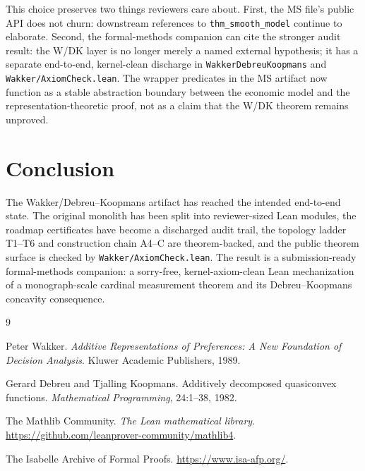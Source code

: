 \documentclass[11pt,english]{article}
\begin{document}
This choice preserves two things reviewers care about.  First, the MS file's public API does not churn: downstream references to \texttt{thm\_smooth\_model} continue to elaborate.  Second, the formal-methods companion can cite the stronger audit result: the W/DK layer is no longer merely a named external hypothesis; it has a separate end-to-end, kernel-clean discharge in \texttt{WakkerDebreuKoopmans} and \texttt{Wakker/AxiomCheck.lean}.  The wrapper predicates in the MS artifact now function as a stable abstraction boundary between the economic model and the representation-theoretic proof, not as a claim that the W/DK theorem remains unproved.

\section{Conclusion}
\label{sec:conclusion}

The Wakker/Debreu--Koopmans artifact has reached the intended end-to-end state.  The original monolith has been split into reviewer-sized Lean modules, the roadmap certificates have become a discharged audit trail, the topology ladder T1--T6 and construction chain A4--C are theorem-backed, and the public theorem surface is checked by \texttt{Wakker/AxiomCheck.lean}.  The result is a submission-ready formal-methods companion: a sorry-free, kernel-axiom-clean Lean mechanization of a monograph-scale cardinal measurement theorem and its Debreu--Koopmans concavity consequence.

\begin{thebibliography}{9}

Peter Wakker.
\newblock \emph{Additive Representations of Preferences: A New Foundation of Decision Analysis}.
\newblock Kluwer Academic Publishers, 1989.

Gerard Debreu and Tjalling Koopmans.
\newblock Additively decomposed quasiconvex functions.
\newblock \emph{Mathematical Programming}, 24:1--38, 1982.

The Mathlib Community.
\newblock \emph{The Lean mathematical library}.
\newblock \url{https://github.com/leanprover-community/mathlib4}.

The Isabelle Archive of Formal Proofs.
\newblock \url{https://www.isa-afp.org/}.

\end{thebibliography}
\end{document}
